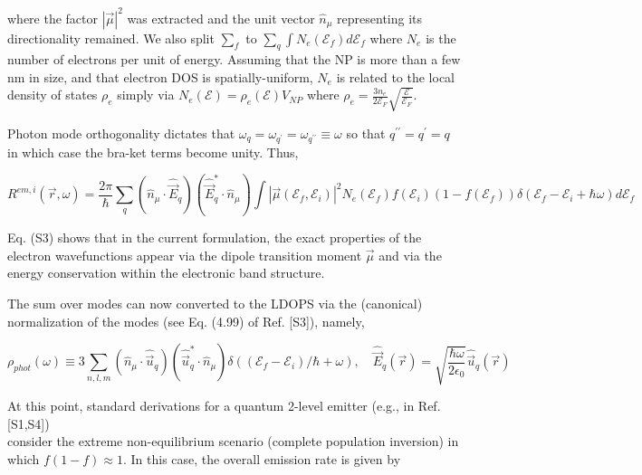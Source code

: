 \documentclass[10pt]{article}
\begin{document}
where the factor $|\vec{\mu}|^{2}$ was extracted and the unit vector $\hat{n}_{\mu}$ representing its directionality remained. We also split $\sum_{f}$ to $\sum_{q} \int N_{e}\left(\mathcal{E}_{f}\right) d \mathcal{E}_{f}$ where $N_{e}$ is the number of electrons per unit of energy. Assuming that the NP is more than a few nm in size, and that electron DOS is spatially-uniform, $N_{e}$ is related to the local density of states $\rho_{e}$ simply via $N_{e}(\mathcal{E})=\rho_{e}(\mathcal{E}) V_{N P}$ where $\rho_{e}=\frac{3 n_{e}}{2 \mathcal{E}_{F}} \sqrt{\frac{\mathcal{E}}{\mathcal{E}_{F}}}$.

Photon mode orthogonality dictates that $\omega_{q}=\omega_{q^{\prime}}=\omega_{q^{\prime \prime}} \equiv \omega$ so that $q^{\prime \prime}=q^{\prime}=q$ in which case the bra-ket terms become unity. Thus,


\begin{equation*}
R^{e m, i}(\vec{r}, \omega)=\frac{2 \pi}{\hbar} \sum_{q}\left(\hat{n}_{\mu} \cdot \hat{\vec{E}}_{q}\right)\left(\hat{\vec{E}}_{q}^{*} \cdot \hat{n}_{\mu}\right) \int\left|\vec{\mu}\left(\mathcal{E}_{f}, \mathcal{E}_{i}\right)\right|^{2} N_{e}\left(\mathcal{E}_{f}\right) f\left(\mathcal{E}_{i}\right)\left(1-f\left(\mathcal{E}_{f}\right)\right) \delta\left(\mathcal{E}_{f}-\mathcal{E}_{i}+\hbar \omega\right) d \mathcal{E}_{f} \tag{S3}
\end{equation*}


Eq. (S3) shows that in the current formulation, the exact properties of the electron wavefunctions appear via the dipole transition moment $\vec{\mu}$ and via the energy conservation within the electronic band structure.

The sum over modes can now converted to the LDOPS via the (canonical) normalization of the modes (see Eq. (4.99) of Ref. [S3]), namely,


\begin{equation*}
\rho_{p h o t}(\omega) \equiv 3 \sum_{n, l, m}\left(\hat{n}_{\mu} \cdot \hat{\vec{u}}_{q}\right)\left(\hat{\vec{u}}_{q}^{*} \cdot \hat{n}_{\mu}\right) \delta\left(\left(\mathcal{E}_{f}-\mathcal{E}_{i}\right) / \hbar+\omega\right), \quad \hat{\vec{E}}_{q}(\vec{r})=\sqrt{\frac{\hbar \omega}{2 \epsilon_{0}}} \hat{\vec{u}}_{q}(\vec{r}) \tag{S4}
\end{equation*}


At this point, standard derivations for a quantum 2-level emitter (e.g., in Ref. [S1,S4])\\
consider the extreme non-equilibrium scenario (complete population inversion) in which $f(1- f) \approx 1$. In this case, the overall emission rate is given by
\end{document}
